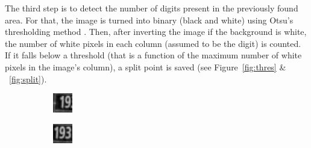 \documentclass{article} %
\begin{document}
The third step is to detect the number of digits present in the previously found area. For that, the image is turned into binary (black and white) using Otsu’s thresholding method\cite{otsu1975threshold,graythresh} . Then, after inverting the image if the background is white, the number of white pixels in each column (assumed to be the digit) is counted. If it falls below a threshold (that is a function of the maximum number of white pixels in the image’s column), a split point is saved (see Figure~\ref{fig:thres} \& ~\ref{fig:split}).


\begin{figure}
\begin{subfigure}{.3\textwidth}
  \centering
  \includegraphics[width=.8\linewidth]{images/image03}
\end{subfigure}%
\begin{subfigure}{.3\textwidth}
  \centering
  \includegraphics[width=.8\linewidth]{images/image07}

\end{subfigure}
\end{figure}
\end{document}
